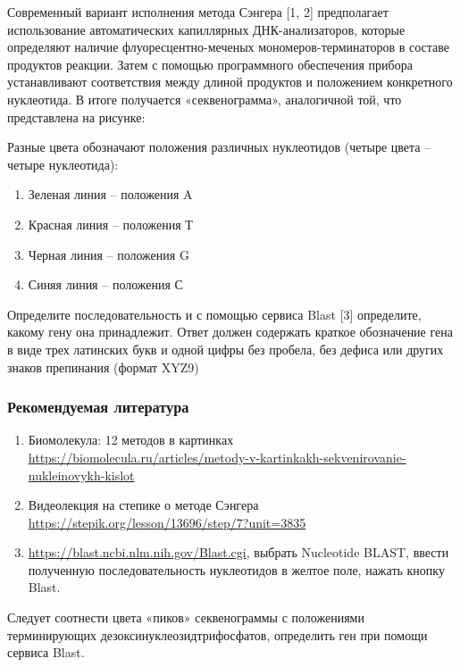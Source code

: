 
Современный вариант исполнения метода Сэнгера [1, 2] предполагает использование автоматических капиллярных ДНК-анализаторов, которые определяют наличие флуоресцентно-меченых мономеров-терминаторов в составе продуктов реакции. Затем с помощью программного обеспечения прибора устанавливают соответствия между длиной продуктов и положением конкретного нуклеотида. В итоге получается «секвенограмма», аналогичной той, что представлена на рисунке:

Разные цвета обозначают положения различных нуклеотидов (четыре цвета – четыре нуклеотида):

\begin{enumerate}
    \item Зеленая линия – положения A
    \item Красная линия – положения Т 
    \item Черная линия – положения G
    \item Синяя линия –  положения С
\end{enumerate}


Определите последовательность и с помощью сервиса Blast [3] определите, какому гену она принадлежит.
Ответ должен содержать краткое обозначение гена в виде трех латинских букв и одной цифры без пробела, без дефиса или других знаков препинания (формат XYZ9)

\subsubsection*{Рекомендуемая литература}

\begin{enumerate}
    \item Биомолекула: 12 методов в картинках \url{https://biomolecula.ru/articles/metody-v-kartinkakh-sekvenirovanie-nukleinovykh-kislot}
    \item Видеолекция на степике о методе Сэнгера \url{https://stepik.org/lesson/13696/step/7?unit=3835}
    \item \url{https://blast.ncbi.nlm.nih.gov/Blast.cgi}, выбрать Nucleotide BLAST, ввести полученную последовательность нуклеотидов в желтое поле, нажать кнопку Blast. 
\end{enumerate}

\explanationSection

Следует соотнести цвета «пиков» секвенограммы с положениями терминирующих дезоксинуклеозидтрифосфатов, определить ген при помощи сервиса Blast.

